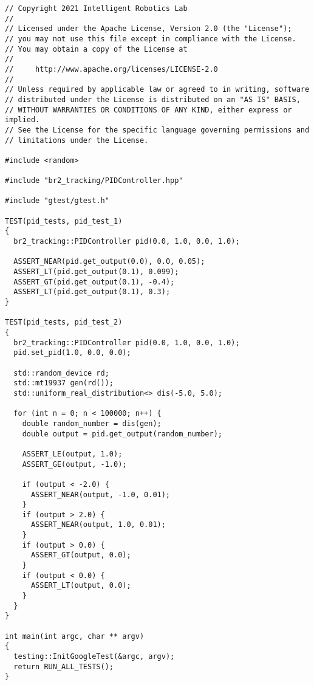  \footnotesize
\begin{tcolorbox}[sharp corners, colframe=gray!80, colback=LightGray, left=0pt, top=0pt, bottom=0pt, title=\texttt{br2\_tracking/tests/pid\_test.cpp}]
  \begin{verbatim}
// Copyright 2021 Intelligent Robotics Lab
//
// Licensed under the Apache License, Version 2.0 (the "License");
// you may not use this file except in compliance with the License.
// You may obtain a copy of the License at
//
//     http://www.apache.org/licenses/LICENSE-2.0
//
// Unless required by applicable law or agreed to in writing, software
// distributed under the License is distributed on an "AS IS" BASIS,
// WITHOUT WARRANTIES OR CONDITIONS OF ANY KIND, either express or implied.
// See the License for the specific language governing permissions and
// limitations under the License.

#include <random>

#include "br2_tracking/PIDController.hpp"

#include "gtest/gtest.h"

TEST(pid_tests, pid_test_1)
{
  br2_tracking::PIDController pid(0.0, 1.0, 0.0, 1.0);

  ASSERT_NEAR(pid.get_output(0.0), 0.0, 0.05);
  ASSERT_LT(pid.get_output(0.1), 0.099);
  ASSERT_GT(pid.get_output(0.1), -0.4);
  ASSERT_LT(pid.get_output(0.1), 0.3);
}

TEST(pid_tests, pid_test_2)
{
  br2_tracking::PIDController pid(0.0, 1.0, 0.0, 1.0);
  pid.set_pid(1.0, 0.0, 0.0);

  std::random_device rd;
  std::mt19937 gen(rd());
  std::uniform_real_distribution<> dis(-5.0, 5.0);

  for (int n = 0; n < 100000; n++) {
    double random_number = dis(gen);
    double output = pid.get_output(random_number);

    ASSERT_LE(output, 1.0);
    ASSERT_GE(output, -1.0);

    if (output < -2.0) {
      ASSERT_NEAR(output, -1.0, 0.01);
    }
    if (output > 2.0) {
      ASSERT_NEAR(output, 1.0, 0.01);
    }
    if (output > 0.0) {
      ASSERT_GT(output, 0.0);
    }
    if (output < 0.0) {
      ASSERT_LT(output, 0.0);
    }
  }
}

int main(int argc, char ** argv)
{
  testing::InitGoogleTest(&argc, argv);
  return RUN_ALL_TESTS();
}
    \end{verbatim}
    \end{tcolorbox}
  \normalsize




